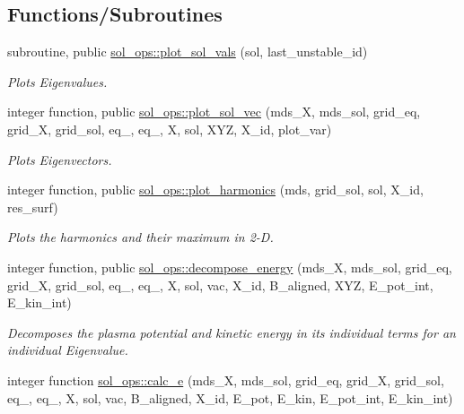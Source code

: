 \subsection*{Functions/\+Subroutines}
\begin{DoxyCompactItemize}
\item 
subroutine, public \hyperlink{namespacesol__ops_a0d4a798a56cfee9bced781d116852165}{sol\+\_\+ops\+::plot\+\_\+sol\+\_\+vals} (sol, last\+\_\+unstable\+\_\+id)
\begin{DoxyCompactList}\small\item\em Plots Eigenvalues. \end{DoxyCompactList}\item 
integer function, public \hyperlink{namespacesol__ops_a13b3cf2fb6437a3c93256368fa91c267}{sol\+\_\+ops\+::plot\+\_\+sol\+\_\+vec} (mds\+\_\+X, mds\+\_\+sol, grid\+\_\+eq, grid\+\_\+X, grid\+\_\+sol, eq\+\_, eq\+\_, X, sol, X\+YZ, X\+\_\+id, plot\+\_\+var)
\begin{DoxyCompactList}\small\item\em Plots Eigenvectors. \end{DoxyCompactList}\item 
integer function, public \hyperlink{namespacesol__ops_a5cec8571480fbc319e7987732fd5995c}{sol\+\_\+ops\+::plot\+\_\+harmonics} (mds, grid\+\_\+sol, sol, X\+\_\+id, res\+\_\+surf)
\begin{DoxyCompactList}\small\item\em Plots the harmonics and their maximum in 2-\/D. \end{DoxyCompactList}\item 
integer function, public \hyperlink{namespacesol__ops_aee487ffbe5d0edff5e37a6500748941c}{sol\+\_\+ops\+::decompose\+\_\+energy} (mds\+\_\+X, mds\+\_\+sol, grid\+\_\+eq, grid\+\_\+X, grid\+\_\+sol, eq\+\_, eq\+\_, X, sol, vac, X\+\_\+id, B\+\_\+aligned, X\+YZ, E\+\_\+pot\+\_\+int, E\+\_\+kin\+\_\+int)
\begin{DoxyCompactList}\small\item\em Decomposes the plasma potential and kinetic energy in its individual terms for an individual Eigenvalue. \end{DoxyCompactList}\item 
integer function \hyperlink{namespacesol__ops_ae094c2a5235324b4aadb53623978d191}{sol\+\_\+ops\+::calc\+\_\+e} (mds\+\_\+X, mds\+\_\+sol, grid\+\_\+eq, grid\+\_\+X, grid\+\_\+sol, eq\+\_, eq\+\_, X, sol, vac, B\+\_\+aligned, X\+\_\+id, E\+\_\+pot, E\+\_\+kin, E\+\_\+pot\+\_\+int, E\+\_\+kin\+\_\+int)

\end{DoxyCompactItemize}
